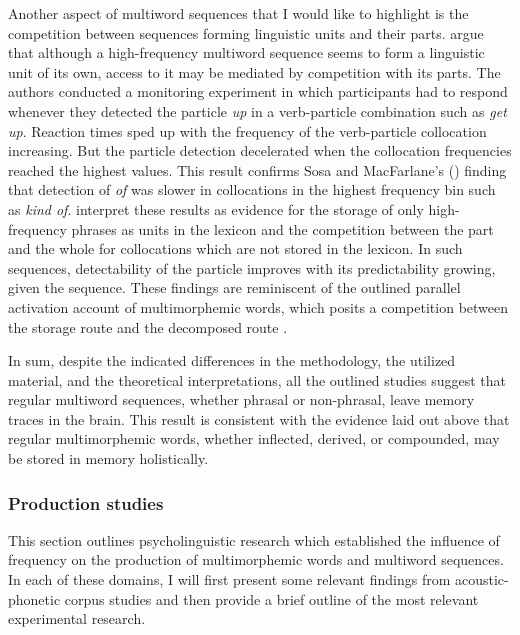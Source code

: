 Another aspect of multiword sequences that I would like to highlight is the competition between sequences forming linguistic units and their parts. \citet{kapatsinski-radicke} argue that although a high-frequency multiword sequence seems to form a linguistic unit of its own, access to it may be mediated by competition with its parts. The authors conducted a monitoring experiment in which participants had to respond whenever they detected the particle \textit{up} in a verb-particle combination such as \textit{get up}. Reaction times sped up with the frequency of the verb-particle collocation increasing. But the particle detection decelerated when the collocation frequencies reached the highest values. This result confirms Sosa and MacFarlane's (\citeyear{sosa-macfarlane}) finding that detection of \textit{of} was slower in collocations in the highest frequency bin such as \textit{kind of}. \citeauthor{kapatsinski-radicke} interpret these results as evidence for the storage of only high-frequency phrases as units in the lexicon and the competition between the part and the whole for collocations which are not stored in the lexicon. In such sequences, detectability of the particle improves with its predictability growing, given the sequence. These findings are reminiscent of the outlined parallel activation account of multimorphemic words, which posits a competition between the storage route and the decomposed route \citep{baayen-dijkstra-schreuder,hay-2001}.

In sum, despite the indicated differences in the methodology, the utilized material, and the theoretical interpretations, all the outlined studies suggest that regular multiword sequences, whether phrasal or non-phrasal, leave memory traces in the brain. This result is consistent with the evidence laid out above that regular multimorphemic words, whether inflected, derived, or compounded, may be stored in memory holistically.

\subsubsection{Production studies}

This section outlines psycholinguistic research which established the influence of frequency on the production of multimorphemic words and multiword sequences. In each of these domains, I will first present some relevant findings from acoustic-phonetic corpus studies and then provide a brief outline of the most relevant experimental research. 

